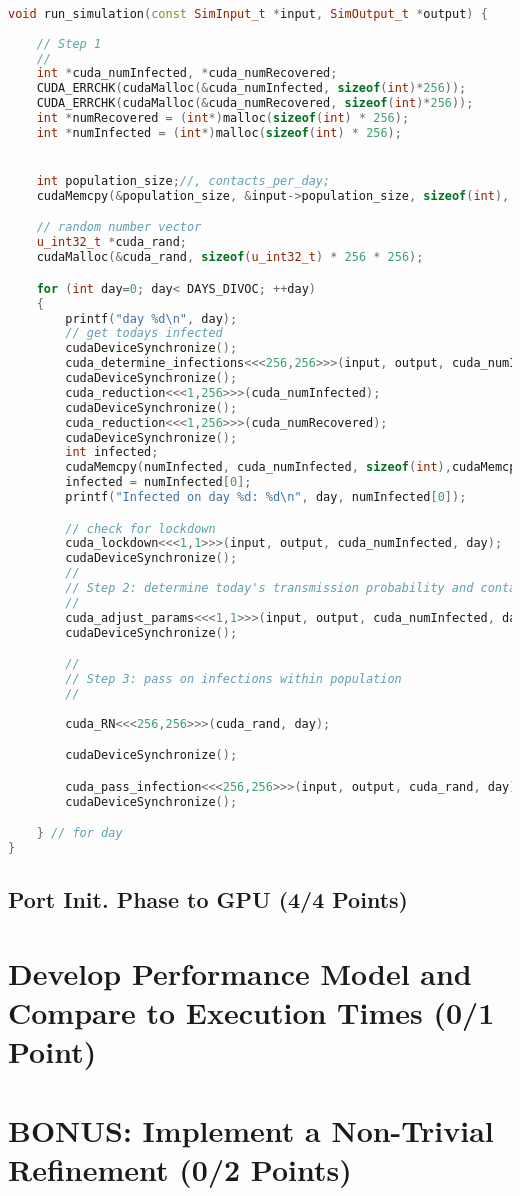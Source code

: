 \begin{lstlisting}[language=C++, title=C++ code for ]
 
void run_simulation(const SimInput_t *input, SimOutput_t *output) {
    
    // Step 1
    //
    int *cuda_numInfected, *cuda_numRecovered;
    CUDA_ERRCHK(cudaMalloc(&cuda_numInfected, sizeof(int)*256));
    CUDA_ERRCHK(cudaMalloc(&cuda_numRecovered, sizeof(int)*256));
    int *numRecovered = (int*)malloc(sizeof(int) * 256);
    int *numInfected = (int*)malloc(sizeof(int) * 256);


    int population_size;//, contacts_per_day;
    cudaMemcpy(&population_size, &input->population_size, sizeof(int), cudaMemcpyDeviceToHost);

    // random number vector 
    u_int32_t *cuda_rand; 
    cudaMalloc(&cuda_rand, sizeof(u_int32_t) * 256 * 256);

    for (int day=0; day< DAYS_DIVOC; ++day)
    {
        printf("day %d\n", day);
        // get todays infected
        cudaDeviceSynchronize();
        cuda_determine_infections<<<256,256>>>(input, output, cuda_numInfected, cuda_numRecovered, day);
        cudaDeviceSynchronize();
        cuda_reduction<<<1,256>>>(cuda_numInfected);
        cudaDeviceSynchronize();
        cuda_reduction<<<1,256>>>(cuda_numRecovered);
        cudaDeviceSynchronize();
        int infected;
        cudaMemcpy(numInfected, cuda_numInfected, sizeof(int),cudaMemcpyDeviceToHost);
        infected = numInfected[0];
        printf("Infected on day %d: %d\n", day, numInfected[0]);

        // check for lockdown
        cuda_lockdown<<<1,1>>>(input, output, cuda_numInfected, day);
        cudaDeviceSynchronize();
        //
        // Step 2: determine today's transmission probability and contacts based on pandemic situation
        //
        cuda_adjust_params<<<1,1>>>(input, output, cuda_numInfected, day);
        cudaDeviceSynchronize();

        //
        // Step 3: pass on infections within population
        //
    
        cuda_RN<<<256,256>>>(cuda_rand, day);

        cudaDeviceSynchronize();

        cuda_pass_infection<<<256,256>>>(input, output, cuda_rand, day);
        cudaDeviceSynchronize();

    } // for day
}

\end{lstlisting}

\subsection{Port Init. Phase to GPU (4/4 Points)}



\section{Develop Performance Model and Compare to Execution Times (0/1 Point)}

\section{BONUS: Implement a Non-Trivial Refinement (0/2 Points)}